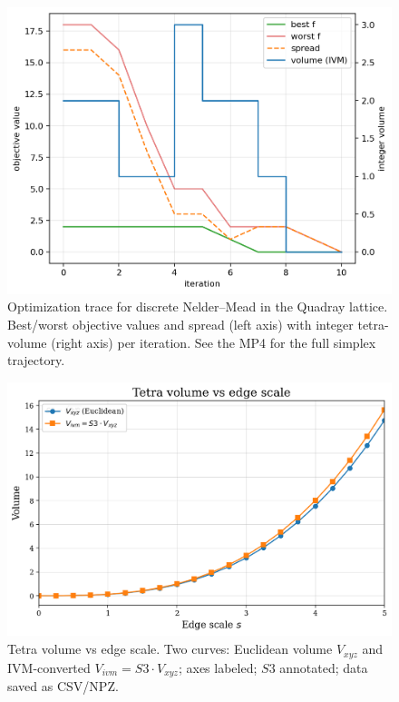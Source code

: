 \documentclass[
]{article}
\begin{document}
\begin{figure}
\hypertarget{fig:simplex_trace}{%
\centering
\includegraphics{../output/simplex_trace.png}
\caption{Optimization trace for discrete Nelder--Mead in the Quadray
lattice. Best/worst objective values and spread (left axis) with integer
tetra-volume (right axis) per iteration. See the MP4 for the full
simplex trajectory.}\label{fig:simplex_trace}
}
\end{figure}

\begin{figure}
\hypertarget{fig:volumes_scale}{%
\centering
\includegraphics{../output/volumes_scale_plot.png}
\caption{Tetra volume vs edge scale. Two curves: Euclidean volume
\(V_{xyz}\) and IVM-converted \(V_{ivm}=S3\cdot V_{xyz}\); axes labeled;
\(S3\) annotated; data saved as CSV/NPZ.}\label{fig:volumes_scale}
}
\end{figure}
\end{document}
